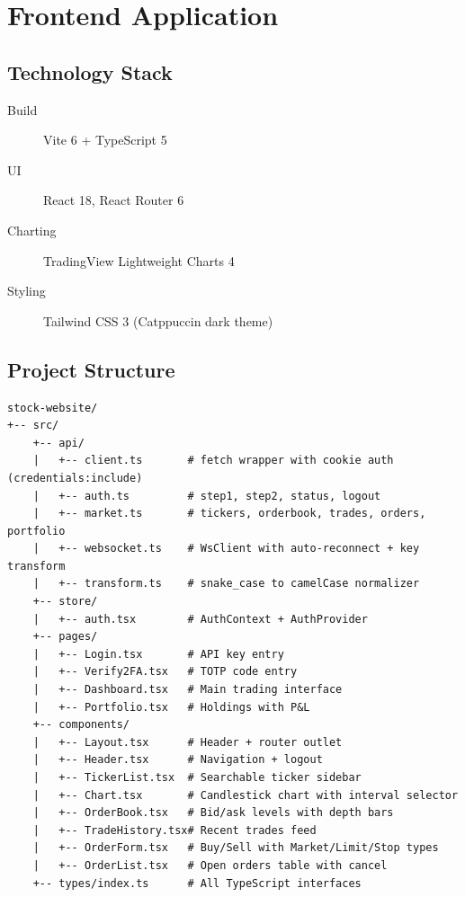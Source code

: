 \documentclass[12pt,a4paper]{report}
\begin{document}
\chapter{Frontend Application}

\section{Technology Stack}

\begin{description}
\item[Build] Vite 6 + TypeScript 5
\item[UI] React 18, React Router 6
\item[Charting] TradingView Lightweight Charts 4
\item[Styling] Tailwind CSS 3 (Catppuccin dark theme)
\end{description}

\section{Project Structure}

\begin{verbatim}
stock-website/
+-- src/
    +-- api/
    |   +-- client.ts       # fetch wrapper with cookie auth (credentials:include)
    |   +-- auth.ts         # step1, step2, status, logout
    |   +-- market.ts       # tickers, orderbook, trades, orders, portfolio
    |   +-- websocket.ts    # WsClient with auto-reconnect + key transform
    |   +-- transform.ts    # snake_case to camelCase normalizer
    +-- store/
    |   +-- auth.tsx        # AuthContext + AuthProvider
    +-- pages/
    |   +-- Login.tsx       # API key entry
    |   +-- Verify2FA.tsx   # TOTP code entry
    |   +-- Dashboard.tsx   # Main trading interface
    |   +-- Portfolio.tsx   # Holdings with P&L
    +-- components/
    |   +-- Layout.tsx      # Header + router outlet
    |   +-- Header.tsx      # Navigation + logout
    |   +-- TickerList.tsx  # Searchable ticker sidebar
    |   +-- Chart.tsx       # Candlestick chart with interval selector
    |   +-- OrderBook.tsx   # Bid/ask levels with depth bars
    |   +-- TradeHistory.tsx# Recent trades feed
    |   +-- OrderForm.tsx   # Buy/Sell with Market/Limit/Stop types
    |   +-- OrderList.tsx   # Open orders table with cancel
    +-- types/index.ts      # All TypeScript interfaces
\end{verbatim}
\end{document}
